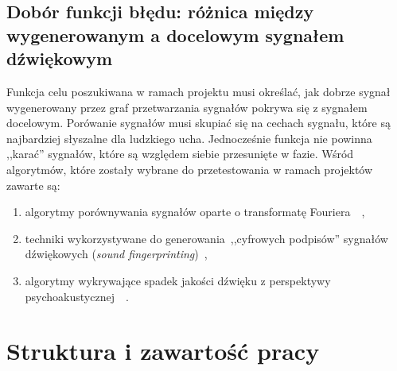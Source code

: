\subsection{Dobór funkcji błędu: różnica między wygenerowanym a docelowym sygnałem dźwiękowym}

Funkcja celu poszukiwana w ramach projektu musi określać, jak dobrze sygnał wygenerowany przez
graf przetwarzania sygnałów pokrywa się z sygnałem docelowym. Porówanie sygnałów musi skupiać się
na cechach sygnału, które są najbardziej słyszalne dla ludzkiego ucha. Jednocześnie funkcja nie powinna
,,karać'' sygnałów, które są względem siebie przesunięte w fazie. Wśród algorytmów, które zostały wybrane
do przetestowania w ramach projektów zawarte są:

\begin{enumerate}
  \item algorytmy porównywania sygnałów oparte o transformatę Fouriera~\cite{sliding_fourier}~\cite{mfcc},
  \item techniki wykorzystywane do generowania~,,cyfrowych podpisów'' sygnałów dźwiękowych (\textit{sound fingerprinting})~\cite{computer_vision_music_identification},
  \item algorytmy wykrywające spadek jakości dźwięku z perspektywy psychoakustycznej~\cite{peaq}~\cite{frechet_audio_distance}.
\end{enumerate}

\section{Struktura i zawartość pracy}


